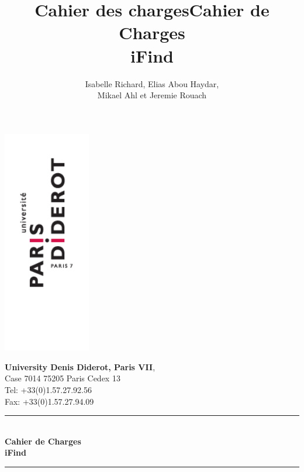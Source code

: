 \documentclass[a4paper,11pt]{article}
\title{Cahier des charges}
\author{Isabelle Richard, Elias Abou Haydar, \\Mikael Ahl et Jeremie Rouach}
\newcommand\blankpage{%
    \null
    \thispagestyle{empty}%
    \addtocounter{page}{-1}%
    \newpage}
\theoremstyle{plain}
\begin{document}
\title{Cahier de Charges \\iFind}

\begin{titlepage}

\newcommand{\HRule}{\rule{\linewidth}{0.5mm}} %

    \begin{minipage}[t]{\textwidth}
        \begin{minipage}[t]{.55 \textwidth}
		    \includegraphics[width=3.8cm]{logo-P7.png}
        \end{minipage}%
        \begin{minipage}[b]{.50 \textwidth}
	    \textbf{University Denis Diderot, Paris VII}, \\
	      {\scriptsize %
	      Case 7014
	      75205 Paris Cedex 13 \\Tel: +33(0)1.57.27.92.56 \\Fax: +33(0)1.57.27.94.09 \\
            }
        \end{minipage}

    \end{minipage}

\center

\HRule \\[0.5cm]
{ \huge \bfseries Cahier de Charges \\ iFind}\\[0.4cm] %
\HRule \\[1.5cm]


\end{titlepage}
\end{document}
